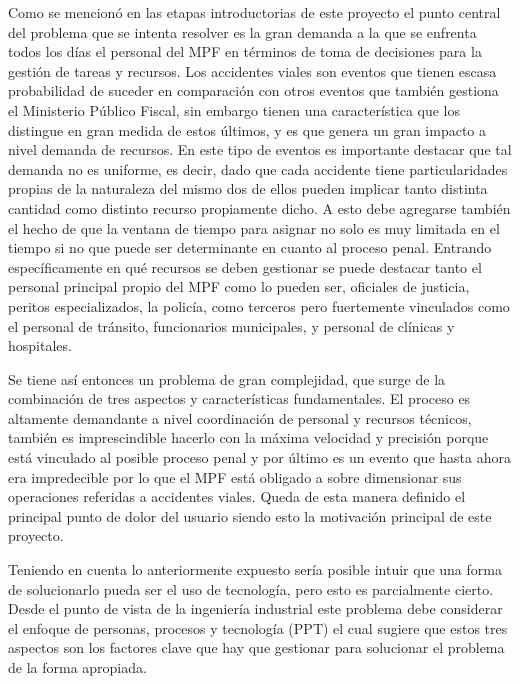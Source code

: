 Como se mencionó en las etapas introductorias de este proyecto el punto central del problema que se intenta resolver es la gran demanda a la que se enfrenta todos los días el personal del MPF en términos de toma de decisiones para la gestión de tareas y recursos. Los accidentes viales son eventos que tienen escasa probabilidad de suceder en comparación con otros eventos que también gestiona el Ministerio Público Fiscal, sin embargo tienen una característica que los distingue en gran medida de estos últimos, y es que genera un gran impacto a nivel demanda de recursos. En este tipo de eventos es importante destacar que tal demanda no es uniforme, es decir, dado que cada accidente tiene particularidades propias de la naturaleza del mismo dos de ellos pueden implicar tanto distinta cantidad como distinto recurso propiamente dicho. A esto debe agregarse también el hecho de que la ventana de tiempo para asignar no solo es muy limitada en el tiempo si no que puede ser determinante en cuanto al proceso penal. Entrando específicamente en qué recursos se deben gestionar se puede destacar tanto el personal principal propio del MPF como lo pueden ser, oficiales de justicia, peritos especializados, la policía, como terceros pero fuertemente vinculados como el personal de tránsito, funcionarios municipales, y personal de clínicas y hospitales.

Se tiene así entonces un problema de gran complejidad, que surge de la combinación de tres aspectos y características fundamentales. El proceso es altamente demandante a nivel coordinación de personal y recursos técnicos, también es imprescindible hacerlo con la máxima velocidad y precisión porque está vinculado al posible proceso penal y por último es un evento que hasta ahora era impredecible por lo que el MPF está obligado a sobre dimensionar sus operaciones referidas a accidentes viales. Queda de esta manera definido el principal punto de dolor del usuario siendo esto la motivación principal de este proyecto.

Teniendo en cuenta lo anteriormente expuesto sería posible intuir que una forma de solucionarlo pueda ser el uso de tecnología, pero esto es parcialmente cierto. Desde el punto de vista de la ingeniería industrial este problema debe considerar el enfoque de personas, procesos y tecnología (PPT) el cual sugiere que estos tres aspectos son los factores clave que hay que gestionar para solucionar el problema de la forma apropiada.

